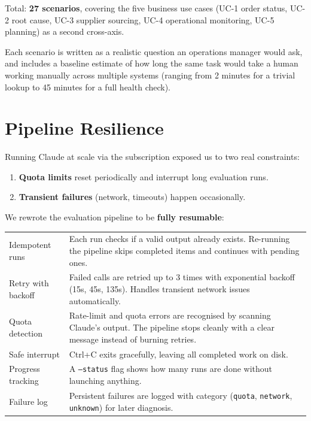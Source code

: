 \documentclass[11pt,a4paper]{article}
\begin{document}
Total: \textbf{27 scenarios}, covering the five business use cases (UC-1 order status, UC-2 root cause, UC-3 supplier sourcing, UC-4 operational monitoring, UC-5 planning) as a second cross-axis.

Each scenario is written as a realistic question an operations manager would ask, and includes a baseline estimate of how long the same task would take a human working manually across multiple systems (ranging from 2 minutes for a trivial lookup to 45 minutes for a full health check).

\section{Pipeline Resilience}

Running Claude at scale via the subscription exposed us to two real constraints:
\begin{enumerate}[itemsep=0.3em]
    \item \textbf{Quota limits} reset periodically and interrupt long evaluation runs.
    \item \textbf{Transient failures} (network, timeouts) happen occasionally.
\end{enumerate}

We rewrote the evaluation pipeline to be \textbf{fully resumable}:

\begin{table}[H]
\centering\small
\begin{tabularx}{\textwidth}{@{} L{4.5cm} X @{}}
\toprule
{} &  \\
\midrule
Idempotent runs       & Each run checks if a valid output already exists. Re-running the pipeline skips completed items and continues with pending ones. \\
Retry with backoff    & Failed calls are retried up to 3 times with exponential backoff (15s, 45s, 135s). Handles transient network issues automatically. \\
Quota detection       & Rate-limit and quota errors are recognised by scanning Claude's output. The pipeline stops cleanly with a clear message instead of burning retries. \\
Safe interrupt        & Ctrl+C exits gracefully, leaving all completed work on disk. \\
Progress tracking     & A \texttt{--status} flag shows how many runs are done without launching anything. \\
Failure log           & Persistent failures are logged with category (\texttt{quota}, \texttt{network}, \texttt{unknown}) for later diagnosis. \\
\bottomrule
\end{tabularx}
\end{table}
\end{document}
